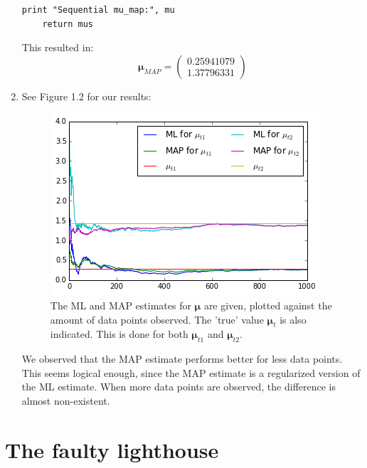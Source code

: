 \documentclass[a4paper,10pt]{article}
\numberwithin{equation}{section} %
\numberwithin{figure}{section} %
\numberwithin{table}{section} %
\theoremstyle{mytheor}
\begin{document}
\begin{enumerate}
\begin{lstlisting}[label={list:first},caption=Python code for function \textit{sequential\_learning\_map(data, mu\_p, sigma\_p, sigma\_t)}.]
    print "Sequential mu_map:", mu
    return mus
    		\end{lstlisting}
    		This resulted in:
    		\begin{equation}
    		\boldsymbol \mu_{MAP} = \begin{pmatrix} 0.25941079 \\ 1.37796331 \end{pmatrix}
    		\end{equation}
	\item See Figure 1.2 for our results: \begin{figure}[h!]
   			\centering
   			\includegraphics{mu.png}\vspace{-0.2cm}
   			\caption{\vspace{-0.2cm} The ML and MAP estimates for $\boldsymbol \mu$ are given, plotted against the amount of data points observed. The 'true' value $\boldsymbol \mu_t$ is also indicated. This is done for both $\boldsymbol \mu_{t1}$ and $\boldsymbol \mu_{t2}$. }
  		\end{figure}
  		We observed that the MAP estimate performs better for less data points. This seems logical enough, since the MAP estimate is a regularized version of the ML estimate. When more data points are observed, the difference is almost non-existent.
\end{enumerate}

\section{The faulty lighthouse}
\end{document}
